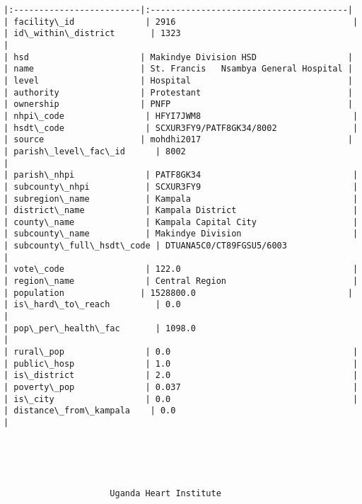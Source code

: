 \documentclass[11pt]{article}
\begin{document}
\begin{Verbatim}[commandchars=\\\{\}]
|:-------------------------|:---------------------------------------|
| facility\_id              | 2916                                   |
| id\_within\_district       | 1323                                   |
| hsd                      | Makindye Division HSD                  |
| name                     | St. Francis   Nsambya General Hospital |
| level                    | Hospital                               |
| authority                | Protestant                             |
| ownership                | PNFP                                   |
| nhpi\_code                | HFYI7JWM8                              |
| hsdt\_code                | SCXUR3FY9/PATF8GK34/8002               |
| source                   | mohdhi2017                             |
| parish\_level\_fac\_id      | 8002                                   |
| parish\_nhpi              | PATF8GK34                              |
| subcounty\_nhpi           | SCXUR3FY9                              |
| subregion\_name           | Kampala                                |
| district\_name            | Kampala District                       |
| county\_name              | Kampala Capital City                   |
| subcounty\_name           | Makindye Division                      |
| subcounty\_full\_hsdt\_code | DTUANA5C0/CT89FGSU5/6003               |
| vote\_code                | 122.0                                  |
| region\_name              | Central Region                         |
| population               | 1528800.0                              |
| is\_hard\_to\_reach         | 0.0                                    |
| pop\_per\_health\_fac       | 1098.0                                 |
| rural\_pop                | 0.0                                    |
| public\_hosp              | 1.0                                    |
| is\_district              | 2.0                                    |
| poverty\_pop              | 0.037                                  |
| is\_city                  | 0.0                                    |
| distance\_from\_kampala    | 0.0                                    |





                     Uganda Heart Institute                     


\end{Verbatim}
\end{document}
